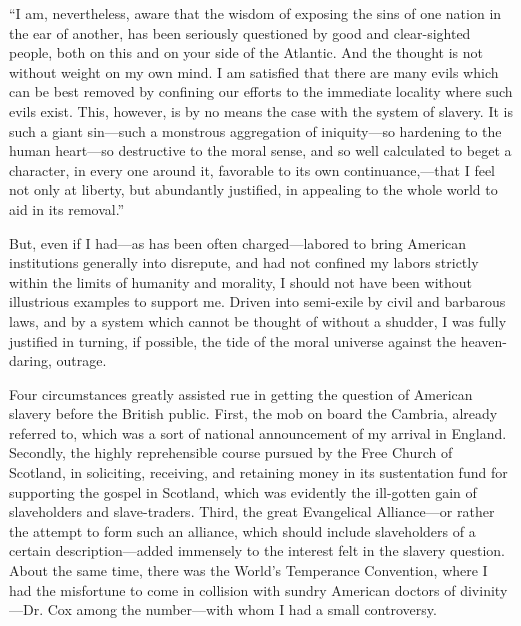 {``I am, nevertheless, aware that the wisdom of exposing the sins of one
nation in the ear of another, has been seriously questioned by good and
clear-sighted people, both on this and on your side of the Atlantic. And
the thought is not without weight on my own mind. I am satisfied that
there are many evils which can be best removed by confining our efforts
to the immediate locality where such evils exist. This, however, is by
no means the case with the system of slavery. It is such a giant
sin---such a monstrous aggregation of iniquity---so hardening to the
human heart---so destructive to the moral sense, and so well calculated
to beget a character, in every one around it, favorable to its own
continuance,---that I feel not only at liberty, but abundantly
justified, in appealing to the whole world to aid in its removal.''}

But, even if I had---as has been often charged---labored to bring
American institutions generally into disrepute, and had not confined my
labors strictly within the limits of humanity and morality, I should not
have been without illustrious examples to support me. Driven into
semi-exile by civil and barbarous laws, and by a system which cannot be
thought of without a shudder, I was fully justified in turning, if
possible, the tide of the moral universe against the heaven-daring,
outrage.

{\protect\hypertarget{380}{}{}}Four circumstances greatly assisted rue
in getting the question of American slavery before the British public.
First, the mob on board the Cambria, already referred to, which was a
sort of national announcement of my arrival in England. Secondly, the
highly reprehensible course pursued by the Free Church of Scotland, in
soliciting, receiving, and retaining money in its sustentation fund for
supporting the gospel in Scotland, which was evidently the ill-gotten
gain of slaveholders and slave-traders. Third, the great Evangelical
Alliance---or rather the attempt to form such an alliance, which should
include slaveholders of a certain description---added immensely to the
interest felt in the slavery question. About the same time, there was
the World's Temperance Convention, where I had the misfortune to come in
collision with sundry American doctors of divinity---Dr. Cox among the
number---with whom I had a small controversy.

